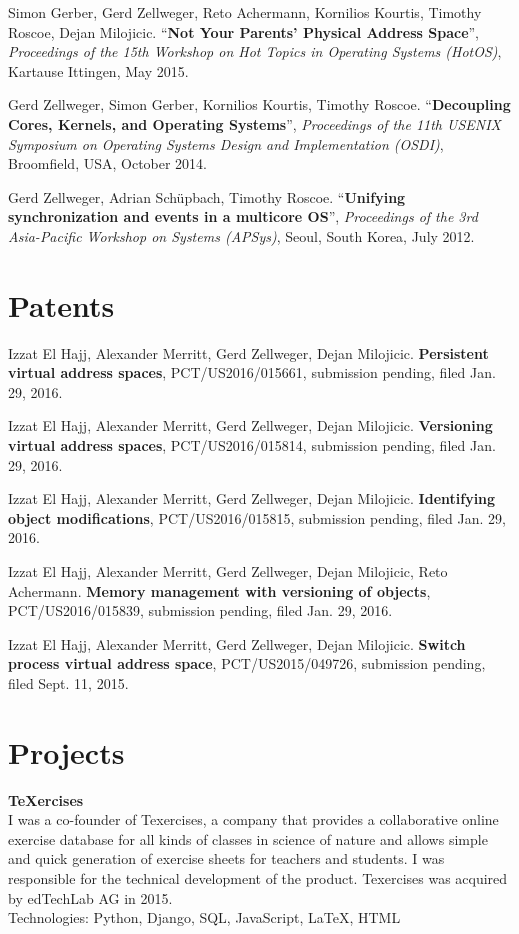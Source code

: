 \documentclass[margin,line]{resume}
\begin{document}
\begin{resume}
Simon Gerber, Gerd Zellweger, Reto Achermann, Kornilios Kourtis, Timothy Roscoe, Dejan Milojicic.
``\textbf{Not Your Parents' Physical Address Space}'', \textsl{Proceedings of the 15th Workshop on Hot Topics in Operating Systems (HotOS)}, Kartause Ittingen, May 2015.

Gerd Zellweger, Simon Gerber, Kornilios Kourtis, Timothy Roscoe.
``\textbf{Decoupling Cores, Kernels, and Operating Systems}'',
\textsl{Proceedings of the 11th USENIX Symposium on Operating Systems Design and Implementation (OSDI)}, Broomfield, USA, October 2014.

Gerd Zellweger, Adrian Schüpbach, Timothy Roscoe.
``\textbf{Unifying synchronization and events in a multicore OS}'',
\textsl{Proceedings of the 3rd Asia-Pacific Workshop on Systems (APSys)}, Seoul, South Korea, July 2012.



\section{\mysidestyle Patents}

Izzat El Hajj, Alexander Merritt, Gerd Zellweger, Dejan Milojicic.
\textbf{Persistent virtual address spaces}, PCT/US2016/015661, submission
pending, filed Jan. 29, 2016.

Izzat El Hajj, Alexander Merritt, Gerd Zellweger, Dejan Milojicic.
\textbf{Versioning virtual address spaces}, PCT/US2016/015814, submission
pending, filed Jan. 29, 2016.

Izzat El Hajj, Alexander Merritt, Gerd Zellweger, Dejan Milojicic.
\textbf{Identifying object modifications}, PCT/US2016/015815, submission
pending, filed Jan. 29, 2016.

Izzat El Hajj, Alexander Merritt, Gerd Zellweger, Dejan Milojicic, Reto
Achermann. \textbf{Memory management with versioning of objects},
PCT/US2016/015839, submission pending, filed Jan. 29, 2016.

Izzat El Hajj, Alexander Merritt, Gerd Zellweger, Dejan Milojicic.
\textbf{Switch process virtual address space}, PCT/US2015/049726, submission
pending, filed Sept. 11, 2015.

\pagebreak

\section{\mysidestyle Projects}
\textbf{{\TeX}ercises} \\\vspace{1mm}%
I was a co-founder of Texercises, a company that provides a collaborative online
exercise database for all kinds of classes in science of nature and allows
simple and quick generation of exercise sheets for teachers and students. I was
responsible for the technical development of the product. Texercises was
acquired by edTechLab AG in 2015.\\
Technologies: Python, Django, SQL, JavaScript, LaTeX, HTML


\end{resume}
\end{document}
